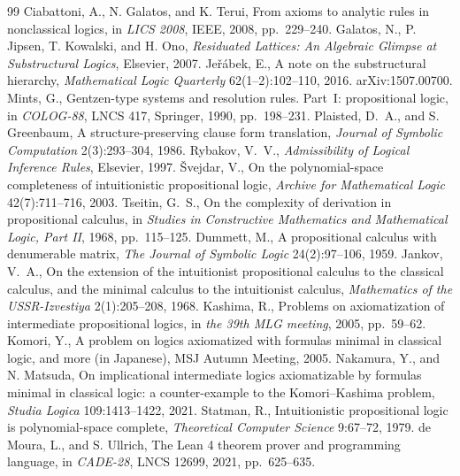 \begin{thebibliography}{99}
 Ciabattoni, A., N. Galatos, and K. Terui, From axioms to
  analytic rules in nonclassical logics, in \emph{LICS 2008}, IEEE, 2008,
  pp.~229--240.
 Galatos, N., P. Jipsen, T. Kowalski, and H. Ono,
  \emph{Residuated Lattices: An Algebraic Glimpse at Substructural Logics},
  Elsevier, 2007.
 Jeřábek, E., A note on the substructural hierarchy,
  \emph{Mathematical Logic Quarterly} 62(1--2):102--110, 2016.
  arXiv:1507.00700.
 Mints, G., Gentzen-type systems and resolution rules.
  Part~I: propositional logic, in \emph{COLOG-88}, LNCS 417, Springer, 1990,
  pp.~198--231. 
 Plaisted, D.~A., and S. Greenbaum, A structure-preserving
  clause form translation, \emph{Journal of Symbolic Computation}
  2(3):293--304, 1986.
 Rybakov, V.~V., \emph{Admissibility of Logical Inference
  Rules}, Elsevier, 1997.
 Švejdar, V., On the polynomial-space completeness of
  intuitionistic propositional logic, \emph{Archive for Mathematical Logic}
  42(7):711--716, 2003.
 Tseitin, G.~S., On the complexity of derivation in
  propositional calculus, in \emph{Studies in Constructive Mathematics and
  Mathematical Logic, Part II}, 1968, pp.~115--125.
 Dummett, M., A propositional calculus with denumerable
  matrix, \emph{The Journal of Symbolic Logic} 24(2):97--106, 1959.
 Jankov, V.~A., On the extension of the intuitionist
  propositional calculus to the classical calculus, and the minimal calculus
  to the intuitionist calculus, \emph{Mathematics of the USSR-Izvestiya}
  2(1):205--208, 1968.
 Kashima, R., Problems on axiomatization of intermediate
  propositional logics, in \emph{the 39th MLG meeting}, 2005, pp.~59--62.
 Komori, Y., A problem on logics axiomatized with formulas
  minimal in classical logic, and more (in Japanese), MSJ Autumn Meeting,
  2005.
 Nakamura, Y., and N. Matsuda, On implicational intermediate
  logics axiomatizable by formulas minimal in classical logic: a
  counter-example to the Komori--Kashima problem, \emph{Studia Logica}
  109:1413--1422, 2021.
 Statman, R., Intuitionistic propositional logic is
  polynomial-space complete, \emph{Theoretical Computer Science}
  9:67--72, 1979.
 de Moura, L., and S. Ullrich, The Lean 4 theorem prover
  and programming language, in \emph{CADE-28}, LNCS 12699, 2021,
  pp.~625--635.
\end{thebibliography}
